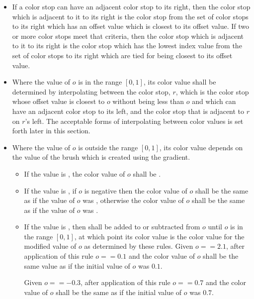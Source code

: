 \begin{itemize}
\item If a color stop can have an adjacent color stop to its right, then the color stop which is adjacent to it to its right is the color stop from the set of color stops to its right which has an offset value which is closest to its offset value. If two or more color stops meet that criteria, then the color stop which is adjacent to it to its right is the color stop which has the lowest index value from the set of color stops to its right which are tied for being closest to its offset value.

\item Where the value of $o$ is in the range $[0,1]$, its color value shall be determined by interpolating between the color stop, $r$, which is the color stop whose offset value is closest to $o$ without being less than $o$ and which can have an adjacent color stop to its left, and the color stop that is adjacent to $r$ on $r$'s left. The acceptable forms of interpolating between color values is set forth later in this section.

\item Where the value of $o$ is outside the range $[0,1]$, its color value depends on the  value of the brush which is created using the gradient.
	\begin{itemize}
	\item If the  value is , the color value of $o$ shall be .
	
	\item If the  value is , if $o$ is negative then the color value of $o$ shall be the same as if the value of $o$ was , otherwise the color value of $o$ shall be the same as if the value of $o$ was .
	
	\item If the  value is , then  shall be added to or subtracted from $o$ until $o$ is in the range $[0,1]$, at which point its color value is the color value for the modified value of $o$ as determined by these rules.
	\enterexample
	Given $o == 2.1$, after application of this rule $o == 0.1$ and the color value of $o$ shall be the same value as if the initial value of $o$ was $0.1$.
	
	Given $o == -0.3$, after application of this rule $o == 0.7$ and the color value of $o$ shall be the same as if the initial value of $o$ was $0.7$.
	\exitexample
	

\end{itemize}
\end{itemize}
